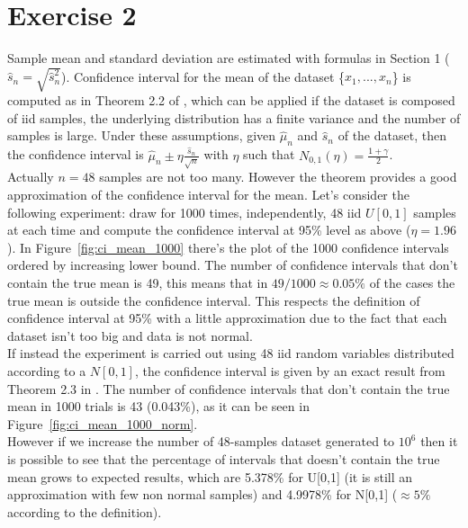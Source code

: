 \documentclass[10pt]{article}
\begin{document}
\section{Exercise 2}
Sample mean and standard deviation are estimated with formulas in Section 1 ($\hat{s}_n = \sqrt{\hat{s}_n^2}$). Confidence interval for the mean of the dataset \{$x_1, ... , x_n$\} is computed as in Theorem 2.2 of \cite{leb}, which can be applied if the dataset is composed of iid samples, the underlying distribution has a finite variance and the number of samples is large. Under these assumptions, given $\hat{\mu}_n$ and $\hat{s}_n$ of the dataset, then the confidence interval is $\hat{\mu}_n \pm \eta \frac{\hat{s}_n}{\sqrt{n}}$ with $\eta$ such that $N_{0,1}(\eta) = \frac{1+\gamma}{2}$. \\
Actually $n=48$ samples are not too many. However the theorem provides a good approximation of the confidence interval for the mean. Let's consider the following experiment: draw for 1000 times, independently, 48 iid  $U[0,1]$ samples at each time and compute the confidence interval at 95\% level as above ($\eta = 1.96$). In Figure~\ref{fig:ci_mean_1000} there's the plot of the 1000 confidence intervals ordered by increasing lower bound. The number of confidence intervals that don't contain the true mean is 49, this means that in $49/1000 \approx 0.05\%$ of the cases the true mean is outside the confidence interval. This respects the definition of confidence interval at 95\% with a little approximation due to the fact that each dataset isn't too big and data is not normal.\\
If instead the experiment is carried out using 48 iid random variables distributed according to a $N[0, 1]$, the confidence interval is given by an exact result from Theorem 2.3 in \cite{leb}. The number of confidence intervals that don't contain the true mean in 1000 trials is 43 (0.043\%), as it can be seen in Figure~\ref{fig:ci_mean_1000_norm}.\\
However if we increase the number of 48-samples dataset generated to $10^6$ then it is possible to see that the percentage of intervals that doesn't contain the true mean grows to expected results, which are 5.378\% for U[0,1] (it is still an approximation with few non normal samples) and 4.9978\% for N[0,1] ($\approx 5\%$ according to the definition).\\
\end{document}
